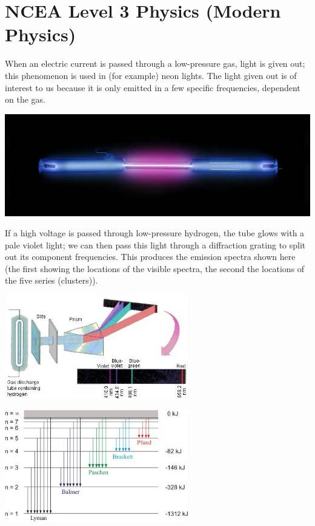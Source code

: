 \documentclass[answers]{exam}
\theoremstyle{definition}
\begin{document}
\section*{NCEA Level 3 Physics (Modern Physics)}
When an electric current is passed through a low-pressure gas, light is given out;
this phenomenon is used in (for example) neon lights. The light given out is of
interest to us because it is only emitted in a few specific frequencies, dependent
on the gas.

\begin{center}
  \includegraphics[width=\textwidth]{hydrogen-light}
\end{center}
If a high voltage is passed through low-pressure hydrogen, the tube glows with a pale
violet light; we can then pass this light through a diffraction grating to split out
its component frequencies. This produces the emission spectra shown here (the first showing the
locations of the visible spectra, the second the locations of the five series (clusters)).
\begin{center}
  \includegraphics[width=0.6\textwidth]{hydrogen1}

  \includegraphics[width=0.6\textwidth]{hydrogen2}
\end{center}
\end{document}
